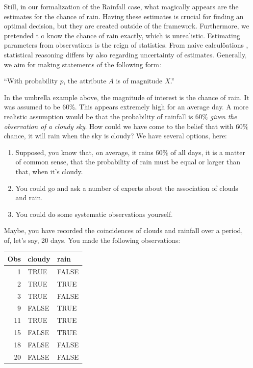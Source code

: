 \documentclass[]{svmono}
\newenvironment{Shaded}{\begin{snugshade}}{\end{snugshade}}
\newcommand{\KeywordTok}[1]{\textcolor[rgb]{0.13,0.29,0.53}{\textbf{#1}}}
\newcommand{\StringTok}[1]{\textcolor[rgb]{0.31,0.60,0.02}{#1}}
\newcommand{\OperatorTok}[1]{\textcolor[rgb]{0.81,0.36,0.00}{\textbf{#1}}}
\newcommand{\NormalTok}[1]{#1}
\theoremstyle{definition}
\theoremstyle{definition}
\theoremstyle{definition}
\theoremstyle{remark}
\begin{document}
Still, in our formalization of the Rainfall case, what magically appears
are the estimates for the chance of rain. Having these estimates is
crucial for finding an optimal decision, but they are created outside of
the framework. Furthermore, we pretended t o know the chance of rain
exactly, which is unrealistic. Estimating parameters from observations
is the reign of statistics. From naive calculöations , statistical
reasoning differs by also regarding uncertainty of estimates. Generally,
we aim for making statements of the following form:

``With probability \(p\), the attribute \(A\) is of magnitude \(X\).''

In the umbrella example above, the magnitude of interest is the chance
of rain. It was assumed to be 60\%. This appears extremely high for an
average day. A more realistic assumption would be that the probability
of rainfall is 60\% \emph{given the observation of a cloudy sky}. How
could we have come to the belief that with 60\% chance, it will rain
when the sky is cloudy? We have several options, here:

\begin{enumerate}
\def\labelenumi{\arabic{enumi}.}
\item
  Supposed, you know that, on average, it rains 60\% of all days, it is
  a matter of common sense, that the probability of rain must be equal
  or larger than that, when it's cloudy.
\item
  You could go and ask a number of experts about the association of
  clouds and rain.
\item
  You could do some systematic observations yourself.
\end{enumerate}

Maybe, you have recorded the coincidences of clouds and rainfall over a
period, of, let's say, 20 days. You made the following observations:

\begin{Shaded}
\end{Shaded}

\begin{longtable}[]{@{}rll@{}}
\toprule
Obs & cloudy & rain\tabularnewline
\midrule
\endhead
1 & TRUE & FALSE\tabularnewline
2 & TRUE & TRUE\tabularnewline
3 & TRUE & FALSE\tabularnewline
9 & FALSE & TRUE\tabularnewline
11 & TRUE & TRUE\tabularnewline
15 & FALSE & TRUE\tabularnewline
18 & FALSE & FALSE\tabularnewline
20 & FALSE & FALSE\tabularnewline
\bottomrule
\end{longtable}
\end{document}
